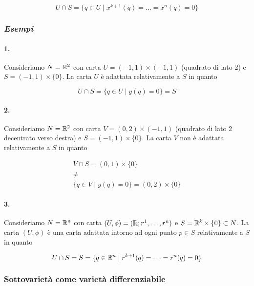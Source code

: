 \begin{equation}
	U \cap S = \{ q \in U \mid x^{k+1}(q) = \dots = x^{n}(q) = 0 \}
\end{equation}

\subsubsection{\textit{Esempi}}

\paragraph{1.}

Consideriamo $ N = \mathbb{R}^{2} $ con carta $ U = (-1,1) \times (-1,1) $ (quadrato di lato 2) e $ S = (-1,1) \times \{0\} $. La carta $ U $ è adattata relativamente a $ S $ in quanto

\begin{equation}
	U \cap S = \{ q \in U \mid y(q) = 0 \} = S
\end{equation}

\paragraph{2.}

Consideriamo $ N = \mathbb{R}^{2} $ con carta $ V = (0,2) \times (-1,1) $ (quadrato di lato 2 decentrato verso destra) e $ S = (-1,1) \times \{0\} $. La carta $ V $ non è adattata relativamente a $ S $ in quanto

\begin{gather}
	V \cap S = (0,1) \times \{0\}\nonumber\\
	\neq\\
	\{ q \in V \mid y(q) = 0 \} = (0,2) \times \{0\}\nonumber
\end{gather}

\paragraph{3.}

Consideriamo $ N = \mathbb{R}^{n} $ con carta $ (U,\phi) = (\mathbb{R};r^{1},\dots,r^{n}) $ e $ S = \mathbb{R}^{k} \times \{0\} \subset N $. La carta $ (U,\phi) $ è una carta adattata intorno ad ogni punto $ p \in S $ relativamente a $ S $ in quanto

\begin{equation}
	U \cap S = S = \{ q \in \mathbb{R}^{n} \mid r^{k+1}(q) = \dots = r^{n}(q) = 0 \}
\end{equation}

\subsubsection{Sottovarietà come varietà differenziabile}

